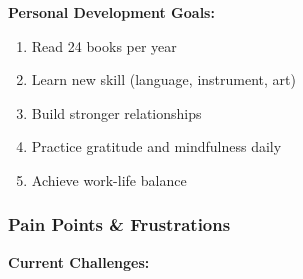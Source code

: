 \textbf{Personal Development Goals:}
\begin{enumerate}
    \item Read 24 books per year
    \item Learn new skill (language, instrument, art)
    \item Build stronger relationships
    \item Practice gratitude and mindfulness daily
    \item Achieve work-life balance
\end{enumerate}

\subsubsection{Pain Points \& Frustrations}

\textbf{Current Challenges:}

